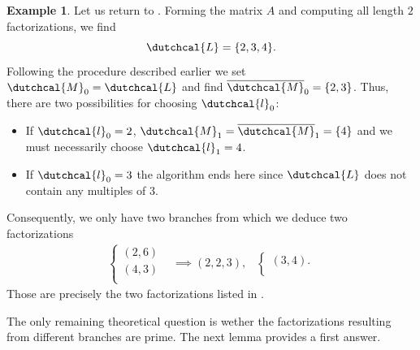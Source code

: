 \documentclass{article}
\numberwithin{equation}{section}
\newcommand{\lcal}{\dutchcal{l}}
\theoremstyle{definition}
\newtheorem{example}[definition]{Example}
\begin{document}
\begin{example}
Let us return to . Forming the matrix $A$ and computing all length $2$ factorizations, we find 
\begin{equation*}
    \dutchcal{L} = \{2,3,4\}.
\end{equation*}
Following the procedure described earlier we set $\dutchcal{M}_0 = \dutchcal{L}$ and find $\overline{\dutchcal{M}}_0=\{2,3\}$. Thus, there are two possibilities for choosing $\lcal_0$:
\begin{itemize}
    \item If $\lcal_0=2$, $\dutchcal{M}_1=\overline{\dutchcal{M}}_1=\{4\}$ and we must necessarily choose $\lcal_1=4$.
    \item If $\lcal_0=3$ the algorithm ends here since $\dutchcal{L}$ does not contain any multiples of $3$.
\end{itemize}
Consequently, we only have two branches from which we deduce two factorizations
\begin{align*}
\begin{cases}
    (2,6) \\
    (4,3) \\
\end{cases}
&\implies (2,2,3), &
\begin{cases}
    (3,4). \\
\end{cases}
\end{align*}
Those are precisely the two factorizations listed in .
\end{example}


The only remaining theoretical question is wether the factorizations resulting from different branches are prime. The next lemma provides a first answer.
\end{document}
